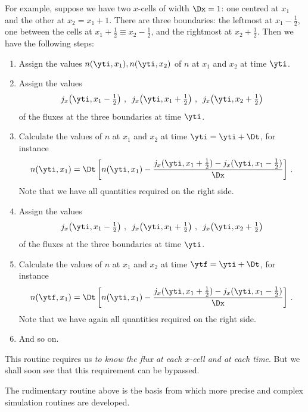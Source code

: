 For example, suppose we have two $x$-cells of width $\Dx=1$: one centred at $x_{1}$ and the other at $x_{2} = x_{1}+1$. There are three boundaries: the leftmost at $x_{1}-\tfrac12$, one between the cells at $x_{1}+\tfrac12 \equiv x_{2}-\tfrac12$, and the rightmost at $x_{2}+\tfrac12$. Then we have the following steps:

{\small

\begin{enumerate}[label=\arabic*.]
\item Assign the values $n(\yti,x_{1}), n(\yti,x_{2})$ of $n$ at $x_{1}$ and $x_{2}$ at time $\yti$.

\item Assign the values $$j_{x}\bigl(\yti,x_{1}-\tfrac12\bigr)\ , \enspace j_{x}\bigl(\yti,x_{1}+\tfrac12\bigr)\ , \enspace j_{x}\bigl(\yti,x_{2}+\tfrac12\bigr)$$
  of the fluxes at the three boundaries at time $\yti$.

\item Calculate the values of $n$ at $x_{1}$ and $x_{2}$ at time $\yti=\yti+\Dt$, for instance
  $$ n(\yti,x_{1}) =
  \Dt\,\biggl[ n(\yti,x_{1}) - \frac{j_{x}(\yti, x_{1}+\tfrac12)-j_{x}(\yti,x_{1}-\tfrac12)}{\Dx} \biggr] \ .$$
  Note that we have all quantities required on the right side.

\item Assign the values $$j_{x}\bigl(\yti,x_{1}-\tfrac12\bigr)\ , \enspace j_{x}\bigl(\yti,x_{1}+\tfrac12\bigr)\ , \enspace j_{x}\bigl(\yti,x_{2}+\tfrac12\bigr)$$
  of the fluxes at the three boundaries at time $\yti$.

\item Calculate the values of $n$ at $x_{1}$ and $x_{2}$ at time $\ytf=\yti+\Dt$, for instance
  $$ n(\ytf,x_{1}) =
  \Dt\,\biggl[ n(\yti,x_{1}) - \frac{j_{x}(\yti, x_{1}+\tfrac12)-j_{x}(\yti,x_{1}-\tfrac12)}{\Dx} \biggr] \ .$$
  Note that we have again all quantities required on the right side.

\item And so on.
\end{enumerate}

}

This routine requires us \emph{to know the flux at each $x$-cell and at each time}. But we shall soon see that this requirement can be bypassed.

The rudimentary routine above is the basis from which more precise and complex simulation routines are developed.

